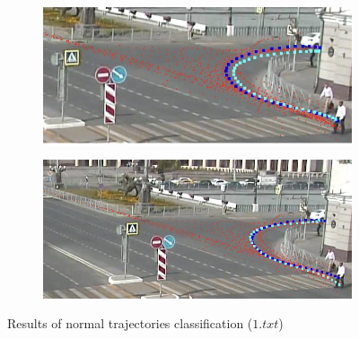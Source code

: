 \begin{figure}[!htb]
\begin{subfigure}[!htb]{0.485\textwidth}
		\centering{}
		\includegraphics[width=\textwidth]{images/classif-res/classif-norm-res-1-3.jpeg}
		\caption{}
	\end{subfigure}
	\hfill
	\begin{subfigure}[!htb]{0.485\textwidth}
		\centering{}
		\includegraphics[width=\textwidth]{images/classif-res/classif-norm-res-1-4.jpeg}
		\caption{}
	\end{subfigure}
	
	\caption{Results of normal trajectories classification ($1.txt$)}
	\label{fig:classif-norm-res-1}
\end{figure}

